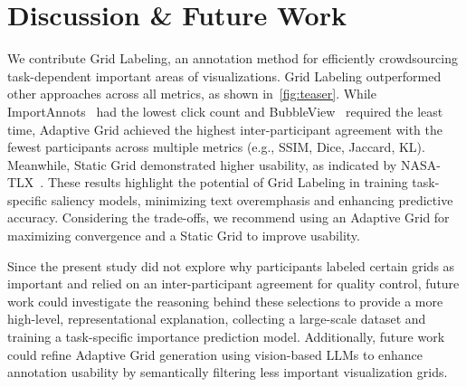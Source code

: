 \section{Discussion \& Future Work}
We contribute Grid Labeling, an annotation method for efficiently crowdsourcing task-dependent important areas of visualizations.
Grid Labeling outperformed other approaches across all metrics, as shown in~\autoref{fig:teaser}.
While ImportAnnots~\cite{importAnnot} had the lowest click count and BubbleView~\cite{bubbleView} required the least time, Adaptive Grid achieved the highest inter-participant agreement with the fewest participants across multiple metrics (e.g., SSIM, Dice, Jaccard, KL). 
Meanwhile, Static Grid demonstrated higher usability, as indicated by NASA-TLX~\cite{hart1988development}.
These results highlight the potential of Grid Labeling in training task-specific saliency models, minimizing text overemphasis and enhancing predictive accuracy.
Considering the trade-offs, we recommend using an Adaptive Grid for maximizing convergence and a Static Grid to improve usability.

Since the present study did not explore why participants labeled certain grids as important and relied on an inter-participant agreement for quality control, future work could investigate the reasoning behind these selections to provide a more high-level, representational explanation, collecting a large-scale dataset and training a task-specific importance prediction model.
Additionally, future work could refine Adaptive Grid generation using vision-based LLMs to enhance annotation usability by semantically filtering less important visualization grids.





